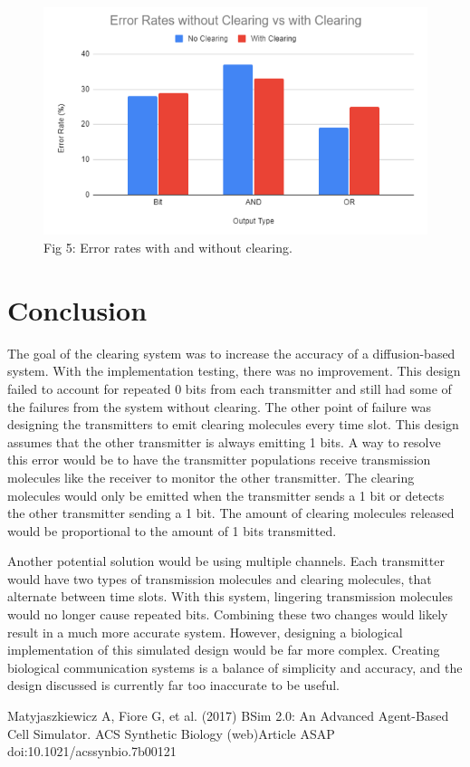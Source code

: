 \documentclass[conference]{IEEEtran}
\begin{document}
\begin{figure}
\includegraphics[width=\linewidth]{Error_Rates.png}
\caption{Fig 5: Error rates with and without clearing.}
\end{figure}

\section{Conclusion}

The goal of the clearing system was to increase the accuracy of a diffusion-based system. With the implementation testing, there was no improvement. This design failed to account for repeated 0 bits from each transmitter and still had some of the failures from the system without clearing. The other point of failure was designing the transmitters to emit clearing molecules every time slot. This design assumes that the other transmitter is always emitting 1 bits. A way to resolve this error would be to have the transmitter populations receive transmission molecules like the receiver to monitor the other transmitter. The clearing molecules would only be emitted when the transmitter sends a 1 bit or detects the other transmitter sending a 1 bit. The amount of clearing molecules released would be proportional to the amount of 1 bits transmitted. 
\\
\par
Another potential solution would be using multiple channels. Each transmitter would have two types of transmission molecules and clearing molecules, that alternate between time slots. With this system, lingering transmission molecules would no longer cause repeated bits. Combining these two changes would likely result in a much more accurate system. However, designing a biological implementation of this simulated design would be far more complex. Creating biological communication systems is a balance of simplicity and accuracy, and the design discussed is currently far too inaccurate to be useful.

\begin{thebibliography}{00}
 Matyjaszkiewicz A, Fiore G, et al. (2017) BSim 2.0: An Advanced Agent-Based Cell Simulator. ACS Synthetic Biology (web)Article ASAP doi:10.1021/acssynbio.7b00121
\vspace{12pt}
\color{red}
\end{thebibliography}
\end{document}
